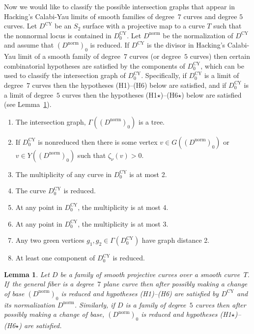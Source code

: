 \documentclass[JEP,XML,SOM,Unicode,NoFloatCountersInSection,published]{cedram}
\theoremstyle{plain}
\newtheorem{lemma}[theorem]{Lemma}
\theoremstyle{definition}
\newcommand\Dcy{{D^{\mathrm{CY}}}}
\newcommand\Dcyo{{D^{\mathrm{CY}}_0}}
\newcommand\Dnorm{{D^{\mathrm{norm}}}}
\newcommand\Dnormo{{(\Dnorm)_0}}
\begin{document}
Now we would like to classify the possible intersection graphs that appear in Hacking's Calabi-Yau limits of smooth families of degree~$7$ curves and degree $5$ curves. Let $\Dcy$ be an $S_2$ surface with a projective map to a curve $T$ such that the nonnormal locus is contained in $\Dcyo$. Let $\Dnorm$ be the normalization of $\Dcy$ and assume that $\Dnormo$ is reduced. If $\Dcy$ is the divisor in Hacking's Calabi-Yau limit of a smooth family of degree~$7$ curves (or degree~$5$ curves) then certain combinatorial hypotheses are satisfied by the components of $\Dcyo$, which can be used to classify the intersection graph of $\Dcyo$. Specifically, if $\Dcyo$ is a limit of degree~$7$ curves then the hypotheses (H1)--(H6) below are satisfied, and if $\Dcyo$ is a limit of degree~$5$ curves then the hypotheses (H1$\star$)--(H6$\star$) below are satisfied (see Lemma~\ref{lem:Dnormsatisfies(Hi)}).
\begin{enumerate}
\item[(H1)\,=\,(H1$\star$)] The intersection graph, $\Gamma(\Dnormo)$ is a tree.
\item[(H2)\,=\,(H2$\star$)] If $\Dcyo$ is nonreduced then there is some vertex $v\in G(\Dnormo)$ or $v\in Y(\Dnormo)$ such that $\zeta_\nu(v)>0$.
\item[(H3)] The multiplicity of any curve in $\Dcyo$ is at most 2.
\item[(H3$\star$)] The curve $\Dcyo$ is reduced.
\item[(H4)] At any point in $\Dcyo$, the multiplicity is at most 4.
\item[(H4$\star$)] At any point in $\Dcyo$, the multiplicity is at most 3.
\item[(H5)\,=\,(H5$\star$)] Any two green vertices $g_1,g_2\in\Gamma(\Dcyo)$ have graph distance 2.
\item[(H6)\,=\,(H6$\star$)] At least one component of $\Dcyo$ is reduced.
\end{enumerate}

\begin{lemma}\label{lem:Dnormsatisfies(Hi)}
Let $D$ be a family of smooth projective curves over a smooth curve~$T$. If~the general fiber is a degree~$7$ plane curve then after possibly making a change of base $\Dnormo$ is reduced and hypotheses \textup{(H1)--(H6)} are satisfied by $\Dcy$ and its normalization $\Dnorm$. Similarly, if $D$ is a family of degree~$5$ curves then after possibly making a change of base, $\Dnormo$ is reduced and hypotheses \textup{(H1$\star$)--(H6$\star$)} are satisfied.
\end{lemma}
\end{document}
